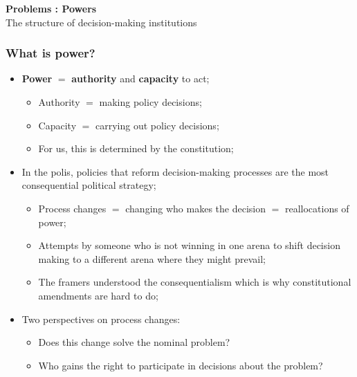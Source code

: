 \documentclass[aspectratio=169]{beamer}
\theoremstyle{principle}
\begin{document}
\begin{frame}

\begin{center}
\Huge\textbf{Problems : Powers}\\
\bigskip
\bigskip
\large The structure of decision-making institutions
\end{center}

\end{frame}

\begin{frame}
\frametitle{What is power?}

\begin{itemize}
\item \textbf{Power} $=$ \textbf{authority} and \textbf{capacity} to act;
\begin{itemize}
\item Authority $=$ making policy decisions;
\item Capacity $=$ carrying out policy decisions;
\item For us, this is determined by the constitution;
\end{itemize}
\bigskip
\bigskip
\item In the polis, policies that reform decision-making processes are the most consequential political strategy;
\begin{itemize}
\item Process changes $=$ changing who makes the decision $=$ reallocations of power;
\item Attempts by someone who is not winning in one arena to shift decision making to a different arena where they might prevail;
\item The framers understood the consequentialism which is why constitutional amendments are hard to do;
\end{itemize}
\bigskip
\bigskip
\item Two perspectives on process changes:
\begin{itemize}
\item Does this change solve the nominal problem?
\item Who gains the right to participate in decisions about the problem?
\end{itemize}
\end{itemize}

\end{frame}
\end{document}
